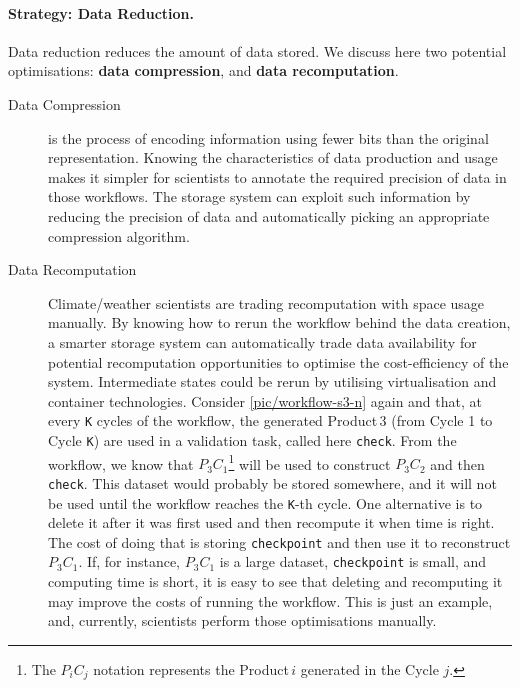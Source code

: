 \documentclass{superfri}
\begin{document}
\paragraph{Strategy: Data Reduction.}

Data reduction reduces the amount of data stored.
We discuss here two potential optimisations: \textbf{data compression}, and \textbf{data recomputation}.

\begin{description}

\item[Data Compression] is the process of encoding information using fewer bits than the original representation.
Knowing the characteristics of data production and usage makes it simpler for scientists to annotate the required precision of data in those workflows.
The storage system can exploit such information by reducing the precision of data and automatically picking an appropriate compression algorithm.

\item[Data Recomputation] Climate/weather scientists are trading recomputation with space usage manually.
By knowing how to rerun the workflow behind the data creation, a smarter storage system can automatically trade data availability for potential recomputation opportunities to optimise the cost-efficiency of the system.
Intermediate states could be rerun by utilising virtualisation and container technologies.
Consider \cref{pic/workflow-s3-n} again and that, at every \texttt{K} cycles of the workflow, the generated Product\,3 (from Cycle 1 to Cycle \texttt{K}) are used in a validation task, called here \texttt{check}.
From the workflow, we know that $P_3 C_1$\footnote{The $P_i C_j$ notation represents the Product\,$i$ generated in the Cycle $j$.} will be used to construct $P_3 C_2$ and then \texttt{check}.
This dataset would probably be stored somewhere, and it will not be used until the workflow reaches the \texttt{K}-th cycle.
One alternative is to delete it after it was first used and then recompute it when time is right.
The cost of doing that is storing \texttt{checkpoint} and then use it to reconstruct $P_3 C_1$.
If, for instance, $P_3 C_1$ is a large dataset, \texttt{checkpoint} is small, and computing time is short, it is easy to see that deleting and recomputing it may improve the costs of running the workflow.
This is just an example, and, currently, scientists perform those optimisations manually.
\end{description}
\end{document}
